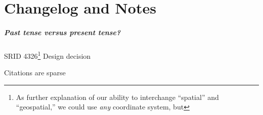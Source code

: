 \chapter{Changelog and Notes}
\label{intro}

\paragraph{Past tense versus present tense?}


SRID 4326\footnote{As further explanation of our ability to interchange ``spatial'' and ``geospatial,'' we could use \textit{any} coordinate system, but }
Design decision

Citations are sparse